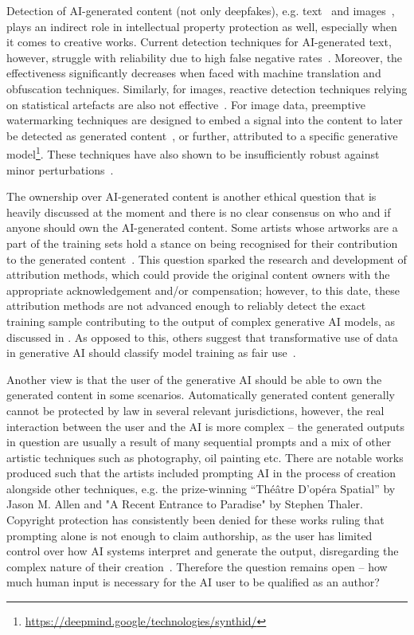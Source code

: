 Detection of AI-generated content (not only deepfakes), e.g. text~\cite{noauthor_science_2024} and images~\cite{liu_detecting_2022}, plays an indirect role in intellectual property protection as well, especially when it comes to creative works. 
Current detection techniques for AI-generated text, however, struggle with reliability due to high false negative rates~\cite{sadasivan_can_2024,weber-wulff_testing_2023}. 
Moreover, the effectiveness significantly decreases when faced with machine translation and obfuscation techniques.
Similarly, for images, reactive detection techniques relying on statistical artefacts are also not effective~\cite{corvi_detection_2023}.
For image data, preemptive watermarking techniques are designed to embed a signal into the content to later be detected as generated content~\cite{zhu_hidden_2018,zhang_udh_2020}, or further, attributed to a specific generative model\footnote{\url{https://deepmind.google/technologies/synthid/}}. %
These techniques have also shown to be insufficiently robust against minor perturbations~\cite{jiang_evading_2023}.


The ownership over AI-generated content is another ethical question that is heavily discussed at the moment and there is no clear consensus on who and if anyone should own the AI-generated content. 
Some artists whose artworks are a part of the training sets hold a stance on being recognised for their contribution to the generated content~\cite{koziol_stable_2023}. 
This question sparked the research and development of attribution methods, which could provide the original content owners with the appropriate acknowledgement and/or compensation; however, to this date, these attribution methods are not advanced enough to reliably detect the exact training sample contributing to the output of complex generative AI models, as discussed in . 
As opposed to this, others suggest that transformative use of data in generative AI should classify model training as fair use~\cite{lemley_fair_2021}.   

Another view is that the user of the generative AI should be able to own the generated content in some scenarios. Automatically generated content generally cannot be protected by law in several relevant jurisdictions, however, the real interaction between the user and the AI is more complex -- the generated outputs in question are usually a result of many sequential prompts and a mix of other artistic techniques such as photography, oil painting etc. 
There are notable works produced such that the artists included prompting AI in the process of creation alongside other techniques, e.g. the prize-winning “Théâtre D’opéra Spatial” by Jason M. Allen and "A Recent Entrance to Paradise" by Stephen Thaler.
Copyright protection has consistently been denied for these works ruling that prompting alone is not enough to claim authorship, as the user has limited control over how AI systems interpret and generate the output, disregarding the complex nature of their creation~\cite{roose_ai-generated_2022,brodkin_us_2023}.
Therefore the question remains open -- how much human input is necessary for the AI user to be qualified as an author?

